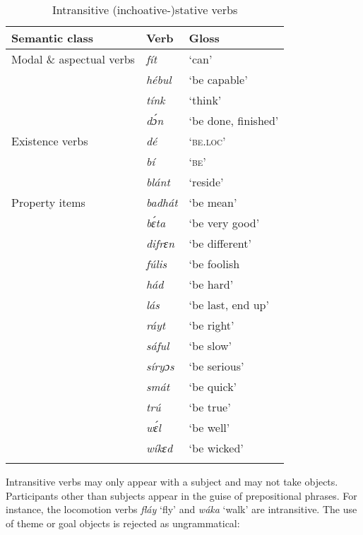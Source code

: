 \begin{table}
\caption{Intransitive (inchoative-)stative verbs}
\label{tab:key:9.4}

\begin{tabularx}{\textwidth}{lXX}
\lsptoprule
Semantic class & Verb & Gloss\\
\midrule 
Modal \& aspectual verbs & \itshape fít & ‘can’\\
& \itshape hébul & ‘be capable’\\
& \itshape tínk & ‘think’\\
& \itshape dɔ́n & ‘be done, finished’\\
Existence verbs & \itshape dé & \textsc{‘be.loc’}\\
& \itshape bí & \textsc{‘be’}\\
& \itshape blánt & ‘reside’\\
Property items & \itshape badhát & ‘be mean’\\
& \itshape bɛ́ta & ‘be very good’\\
& \itshape difrɛn & ‘be different’\\
& \itshape fúlis & ‘be foolish\\
& \itshape hád & ‘be hard’\\
& \itshape lás & ‘be last, end up’\\
& \itshape ráyt & ‘be right’\\
& \itshape sáful & ‘be slow’\\
& \itshape síryɔs & ‘be serious’\\
& \itshape smát & ‘be quick’\\
& \itshape trú & ‘be true’\\
& \itshape wɛ́l & ‘be well’\\
& \itshape wíkɛd & ‘be wicked’\\
\lspbottomrule
\end{tabularx}
\end{table}
Intransitive verbs may only appear with a subject and may not take objects. Participants other than subjects appear in the guise of prepositional phrases. For instance, the locomotion verbs \textit{fláy} ‘fly’ and \textit{wáka} ‘walk’ are intransitive. The use of theme  or goal objects  is rejected as ungrammatical:


\z


